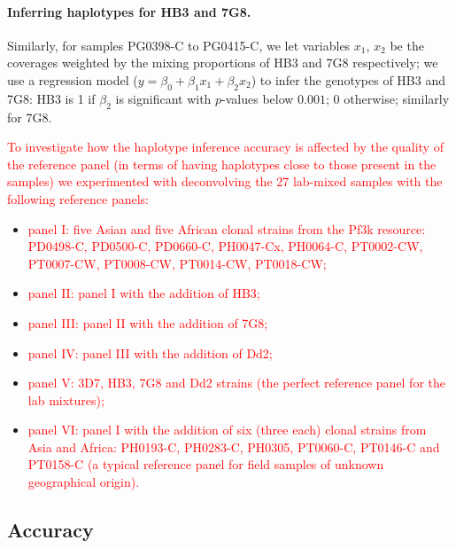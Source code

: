 \documentclass{bioinfo}
\begin{document}
\paragraph{Inferring haplotypes for HB3 and 7G8.}
Similarly, for samples {\textmd PG0398-C} to {\textmd PG0415-C}, we let variables $x_1$, $x_2$ be the coverages weighted by the mixing proportions of HB3 and 7G8 respectively; we use a regression model ($y = \beta_0 + \beta_{1} x_1 + \beta_{2} x_2$) to infer the genotypes of HB3 and 7G8: HB3 is 1 if $\beta_{2}$ is significant with $p$-values below $0.001$; 0 otherwise; similarly for 7G8.

\textcolor{red}{To investigate how the haplotype inference accuracy is affected by the quality of the reference panel (in terms of having haplotypes close to those present in the samples) we experimented with deconvolving the 27 lab-mixed samples with the following reference panels:
}
\begin{itemize}

\item \textcolor{red}{panel I: five Asian and five African clonal strains from the Pf3k \citep{Pf3k2016} resource: {\textmd PD0498-C}, {\textmd PD0500-C}, {\textmd PD0660-C}, {\textmd PH0047-Cx}, {\textmd PH0064-C}, {\textmd PT0002-CW}, {\textmd PT0007-CW}, {\textmd PT0008-CW}, {\textmd PT0014-CW}, {\textmd PT0018-CW};}

\item \textcolor{red}{panel II: panel I with the addition of HB3;}

\item \textcolor{red}{panel III: panel II with the addition of 7G8;}

\item \textcolor{red}{panel IV: panel III with the addition of Dd2;}

\item \textcolor{red}{panel V: 3D7, HB3, 7G8 and Dd2 strains (the perfect reference panel for the lab mixtures);}

\item \textcolor{red}{panel VI: panel I with the addition of six (three each) clonal strains from Asia and Africa: {\textmd PH0193-C}, {\textmd PH0283-C}, {\textmd PH0305}, {\textmd PT0060-C}, {\textmd PT0146-C} and {\textmd PT0158-C} (a typical reference panel for field samples of unknown geographical origin).}

\end{itemize}


\subsection{Accuracy}
\end{document}
